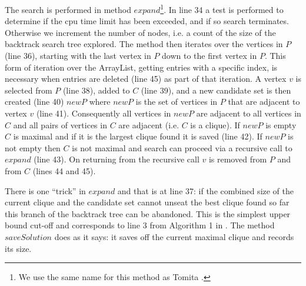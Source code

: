 \documentclass{l4proj}
\begin{document}
The search is performed in method $expand$\footnote{We use the same name for this method as Tomita \cite{tomita2003,tomita2010}.}.
In line 34 a test is performed to determine if the cpu time limit has been exceeded, and if so search terminates. Otherwise we
increment the number of nodes, i.e. a count of the size of the backtrack search tree explored. The method then iterates
over the vertices in $P$ (line 36), starting with the last vertex in $P$ down to the first vertex in $P$. This form
of iteration over the ArrayList, getting entries with a specific index, is necessary when entries are deleted (line 45)
as part of that iteration. A vertex $v$ is selected from $P$ (line 38), 
added to $C$ (line 39), and a new candidate set is then created (line 40)
$newP$ where $newP$ is the set of vertices in $P$ that are adjacent to vertex $v$ (line 41). Consequently all vertices in $newP$
are adjacent to all vertices in $C$ and all pairs of vertices in $C$ are adjacent (i.e. $C$ is a clique). If $newP$ is empty $C$ is 
maximal and if it is the largest clique found it is saved (line 42). If $newP$ is not
empty then $C$ is not maximal and search can proceed via a recursive call to $expand$ (line 43). 
On returning from the recursive call $v$ is removed from $P$ and from $C$ (lines 44 and 45).

There is one ``trick'' in $expand$ and that is at line 37: if the combined size of the current clique and the candidate set
cannot unseat the best clique found so far this branch of the backtrack tree can be abandoned. This is the simplest 
upper bound cut-off and corresponds to line 3 from Algorithm 1 in \cite{fahle}.
The method $saveSolution$ does as it says: it saves off the current maximal clique and records its size.

\begin{figure}

\end{figure}
\end{document}
